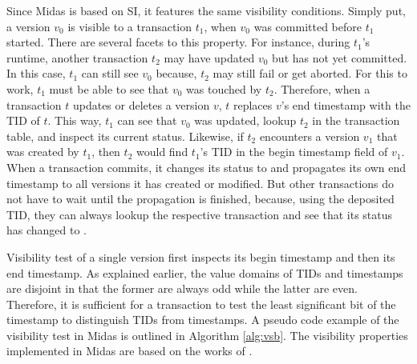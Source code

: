Since Midas is based on SI, it features the same visibility conditions. Simply
put, a version $v_0$ is visible to a transaction $t_1$, when $v_0$ was committed
before $t_1$ started. There are several facets to this property. For instance,
during $t_1$'s runtime, another transaction $t_2$ may have updated $v_0$ but has
not yet committed. In this case, $t_1$ can still see $v_0$ because, $t_2$ may
still fail or get aborted. For this to work, $t_1$ must be able to see that
$v_0$ was touched by $t_2$. Therefore, when a transaction $t$ updates or deletes
a version $v$, $t$ replaces $v$'s end timestamp with the TID of $t$. This way,
$t_1$ can see that $v_0$ was updated, lookup $t_2$ in the transaction table, and
inspect its current status. Likewise, if $t_2$ encounters a version $v_1$ that
was created by $t_1$, then $t_2$ would find $t_1$'s TID in the begin timestamp
field of $v_1$. When a transaction commits, it changes its status to
 and propagates its own end timestamp to all versions it has
created or modified. But other transactions do not have to wait until the
propagation is finished, because, using the deposited TID, they can always
lookup the respective transaction and see that its status has changed to
.

Visibility test of a single version first inspects its begin timestamp and then its end timestamp. As explained earlier, the value domains of TIDs and timestamps are disjoint in that the former are always odd while the latter are even. Therefore, it is sufficient for a transaction to test the least significant bit of the timestamp to distinguish TIDs from timestamps. A pseudo code example of the visibility test in Midas is outlined in Algorithm \ref{alg:vsb}. The visibility properties implemented in Midas are based on
the works of \cite{berenson1995critique, larson2011high}.

\vspace{0.5cm}

